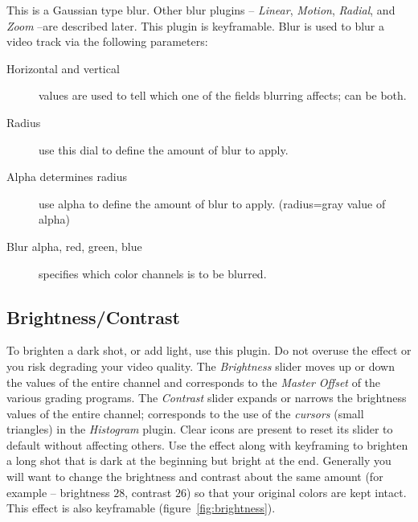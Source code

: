 This is a Gaussian type blur. Other blur plugins -- \textit{Linear}, \textit{Motion}, \textit{Radial}, and \textit{Zoom} --are described later. This plugin is keyframable. Blur is used to blur a video track via the following parameters:
\begin{description}
    \item[Horizontal and vertical] values are used to tell which one of the fields blurring affects; can be both.
    \item[Radius] use this dial to define the amount of blur to apply.
    \item[Alpha determines radius] use alpha to define the amount of blur to apply. (radius=gray value of alpha)
    \item[Blur alpha, red, green, blue] specifies which color channels is to be blurred.
\end{description}

\subsection{Brightness/Contrast}%
\label{sub:brightness_contrast}

To brighten a dark shot, or add light, use this plugin. Do not overuse the effect or you risk degrading your video quality.
The \textit{Brightness} slider moves up or down the values of the entire channel and corresponds to the \textit{Master Offset} of the various grading programs.
The \textit{Contrast} slider expands or narrows the brightness values of the entire channel; corresponds to the use of the \textit{cursors} (small triangles) in the \textit{Histogram} plugin. Clear icons are present to reset its slider to default without affecting others.
Use the effect along with keyframing to brighten a long shot that is dark at the beginning but bright at the end. Generally you will want to change the brightness and contrast about the same amount (for example -- brightness $28$, contrast $26$) so that your original colors are kept intact. This effect is also keyframable (figure~\ref{fig:brightness}).

